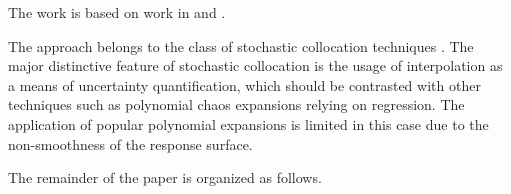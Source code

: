 The work is based on work in \cite{klimke2006} and \cite{ma2009}.

The approach belongs to the class of stochastic collocation techniques
\cite{xiu2010}. The major distinctive feature of stochastic collocation is the
usage of interpolation as a means of uncertainty quantification, which should be
contrasted with other techniques such as polynomial chaos expansions relying on
regression. The application of popular polynomial expansions is limited in this
case due to the non-smoothness of the response surface.

The remainder of the paper is organized as follows.
